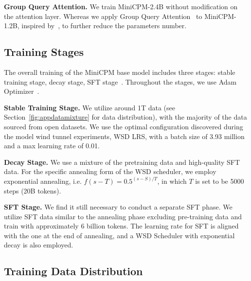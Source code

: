 \noindent\textbf{Group Query Attention.} We train MiniCPM-2.4B without modification on the attention layer. Whereas we apply Group Query Attention~\citep{ainslie-etal-2023-gqa} to MiniCPM-1.2B, inspired by~\cite{liu2024mobilellm}, to further reduce the parameters number.



\subsection{Training Stages}
The overall training of the MiniCPM base model includes three stages: stable training stage, decay stage, SFT stage~\citep{zhang2023instruction,wei2021finetuned}. Throughout the stages, we use Adam Optimizer~\citep{kingma2014adam}. 

\textbf{Stable Training Stage.}
We utilize around 1T data (see Section~\ref{fig:appdatamixture} for data distribution), with the majority of the data sourced from open datasets. We use the optimal configuration discovered during the model wind tunnel experiments, WSD LRS, with a batch size of 3.93 million and a max learning rate of 0.01.

\textbf{Decay Stage.} We use a mixture of the pretraining data and high-quality SFT data.
For the specific annealing form of the WSD scheduler, we employ exponential annealing, i.e. $f(s-T)=  0.5^{(s-S)/T}$, in which $T$ is set to be 5000 steps (20B tokens).

\textbf{SFT Stage.} We find it still necessary to conduct a separate SFT phase. We utilize SFT data similar to the annealing phase excluding pre-training data and train with approximately 6 billion tokens. The learning rate for SFT is aligned with the one at the end of annealing, and a WSD Scheduler with exponential decay is also employed.


\subsection{Training Data Distribution}
\label{sec:appdatadistrbution}



